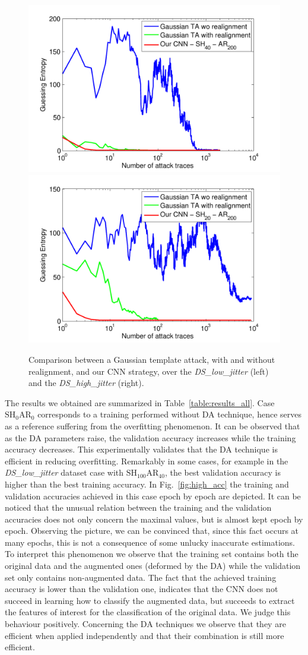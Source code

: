\begin{figure}
\includegraphics[width=.5\textwidth]{../Figures/CHES2017/results_low_jitter_new.pdf} 
\includegraphics[width=.5\textwidth]{../Figures/CHES2017/results_high_jitter_new.pdf} 
\caption{Comparison between a Gaussian template attack, with and without realignment, and our CNN strategy, over the  \emph{DS\_low\_jitter} (left) and the  \emph{DS\_high\_jitter} (right).}\label{fig:compareTA}
\end{figure}




The results we obtained are summarized in Table~\ref{table:results_all}. Case $\mathrm{SH}_0\mathrm{AR}_0$ corresponds to a training performed without DA technique, hence serves as a reference suffering from the overfitting phenomenon. It can be observed that as the DA parameters raise, the validation accuracy increases while the training accuracy decreases. This experimentally validates that the DA technique is efficient in reducing overfitting. Remarkably in some cases, for example in the \emph{DS\_low\_jitter} dataset case with $\mathrm{SH}_{100}\mathrm{AR}_{40}$, the best validation accuracy is higher than the best training accuracy. In Fig.~\ref{fig:high_acc} the training and validation accuracies achieved in this case epoch by epoch are depicted. It can be noticed that the unusual relation between the training and the validation accuracies does not only concern the maximal values, but is almost kept epoch by epoch. Observing the picture, we can be convinced that, since this fact occurs at many epochs, this is not a consequence of some unlucky inaccurate estimations. To interpret this phenomenon we observe that the training set contains both the original data and the augmented ones (\ie deformed by the DA) while the validation set only contains non-augmented data.  The fact that the achieved training accuracy  is lower than the validation one, indicates that the CNN does not succeed in learning how to classify the augmented data, but succeeds to extract the features of interest for the classification of the original data.  We judge this behaviour positively. Concerning the DA techniques we observe that they are efficient when applied independently and that their combination is still more efficient.

